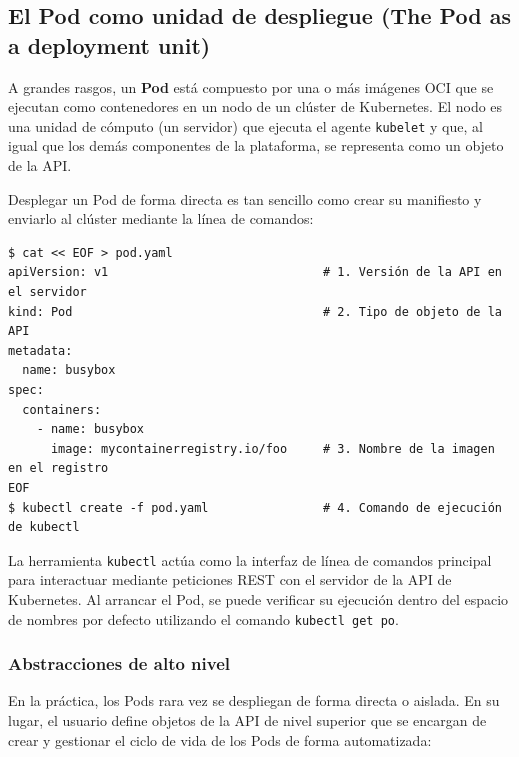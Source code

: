 \subsection{El Pod como unidad de despliegue (The Pod as a deployment unit)}

A grandes rasgos, un \textbf{Pod} está compuesto por una o más imágenes OCI que se ejecutan como contenedores en un nodo de un clúster de Kubernetes. El nodo es una unidad de cómputo (un servidor) que ejecuta el agente \texttt{kubelet} y que, al igual que los demás componentes de la plataforma, se representa como un objeto de la API.

Desplegar un Pod de forma directa es tan sencillo como crear su manifiesto y enviarlo al clúster mediante la línea de comandos:

\begin{verbatim}
$ cat << EOF > pod.yaml
apiVersion: v1                              # 1. Versión de la API en el servidor
kind: Pod                                   # 2. Tipo de objeto de la API
metadata:
  name: busybox
spec:
  containers:
    - name: busybox
      image: mycontainerregistry.io/foo     # 3. Nombre de la imagen en el registro
EOF
$ kubectl create -f pod.yaml                # 4. Comando de ejecución de kubectl
\end{verbatim}

La herramienta \texttt{kubectl} actúa como la interfaz de línea de comandos principal para interactuar mediante peticiones REST con el servidor de la API de Kubernetes. Al arrancar el Pod, se puede verificar su ejecución dentro del espacio de nombres por defecto utilizando el comando \texttt{kubectl get po}.

\subsubsection{Abstracciones de alto nivel}
En la práctica, los Pods rara vez se despliegan de forma directa o aislada. En su lugar, el usuario define objetos de la API de nivel superior que se encargan de crear y gestionar el ciclo de vida de los Pods de forma automatizada:

